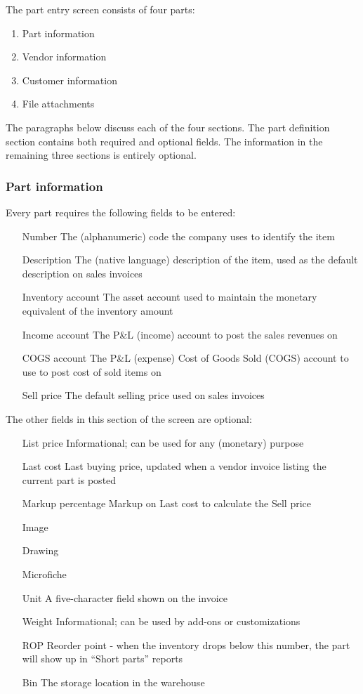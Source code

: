 The part entry screen consists of four parts:

\begin{enumerate}
\item Part information
\item Vendor information
\item Customer information
\item File attachments
\end{enumerate}


The paragraphs below discuss each of the four sections. The part definition section
contains both required and optional fields. The information in the remaining
three sections is entirely optional.

\subsubsection{Part information}
\label{subsec-parts-information}

Every part requires the following fields to be entered:

\begin{itemize}
\item [Number] The (alphanumeric) code the company uses to identify the item
\item [Description] The (native language) description of the item, used as the default
	description on sales invoices
\item [Inventory account] The asset account used to maintain the monetary equivalent
	of the inventory amount
\item [Income account] The P\&L (income) account to post the sales revenues on
\item [COGS account] The P\&L (expense) Cost of Goods Sold (COGS) account to use
	to post cost of sold items on
\item [Sell price] The default selling price used on sales invoices
\end{itemize}


The other fields in this section of the screen are optional:

\begin{itemize}
\item [List price] Informational; can be used for any (monetary) purpose
\item [Last cost] Last buying price, updated when a vendor invoice listing the current part
    is posted
\item [Markup percentage] Markup on Last cost to calculate the Sell price
\item [Image]
\item [Drawing]
\item [Microfiche]
\item [Unit] A five-character field shown on the invoice
\item [Weight] Informational; can be used by add-ons or customizations
\item [ROP] Reorder point - when the inventory drops below this number,
     the part will show up in ``Short parts'' reports
\item [Bin] The storage location in the warehouse
\end{itemize}


